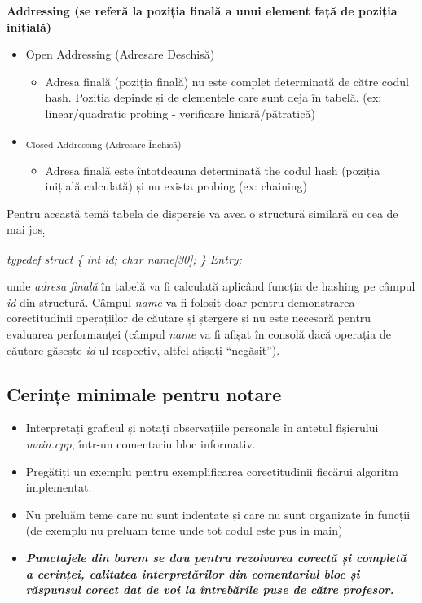 \documentclass[../ro-fa-lab.tex]{subfiles}
\begin{document}
\textbf{Addressing (se referă la poziția finală a unui element față de
poziția inițială)}

\begin{itemize}
\item
  Open Addressing (Adresare Deschisă)

  \begin{itemize}
  \item
    Adresa finală (poziția finală) nu este complet
    determinată de către codul hash. Poziția depinde și de elementele
    care sunt deja în tabelă. (ex: linear/quadratic probing - verificare
    liniară/pătratică)
  \end{itemize}
\item
  \textsubscript{Closed Addressing (Adresare Închisă)}

  \begin{itemize}
  \item
    Adresa finală este întotdeauna determinată the codul
    hash (poziția inițială calculată) și nu exista probing (ex:
    chaining)
  \end{itemize}
\end{itemize}

Pentru această temă tabela de dispersie va avea o structură similară cu
cea de mai jos\textsubscript{:}

\emph{typedef struct \{ int id; char name{[}30{]}; \} Entry;}

unde \emph{adresa finală} în tabelă va fi calculată aplicând funcția de
hashing pe câmpul \emph{id} din structură. Câmpul \emph{name} va fi
folosit doar pentru demonstrarea corectitudinii operațiilor de căutare
și ștergere și nu este necesară pentru evaluarea performanței (câmpul
\emph{name} va fi afișat în consolă dacă operația de căutare găsește
\emph{id}-ul respectiv, altfel afișați ``negăsit'').

\subsection{Cerințe minimale pentru
notare}\label{cerinux21be-minimale-pentru-notare}

\begin{itemize}
\item
  Interpretați graficul și notați observațiile personale în antetul
  fișierului \emph{main.cpp}, într-un comentariu bloc informativ.
\item
  Pregătiți un exemplu pentru exemplificarea corectitudinii fiecărui
  algoritm implementat.
\item
  Nu preluăm teme care nu sunt indentate și care nu sunt organizate în
  funcții (de exemplu nu preluam teme unde tot codul este pus in main)
\item
  \emph{\textbf{Punctajele din barem se dau pentru rezolvarea corectă și
  completă a cerinței, calitatea interpretărilor din comentariul bloc și
  răspunsul corect dat de voi la întrebările puse de către profesor.}}
\end{itemize}
\end{document}
